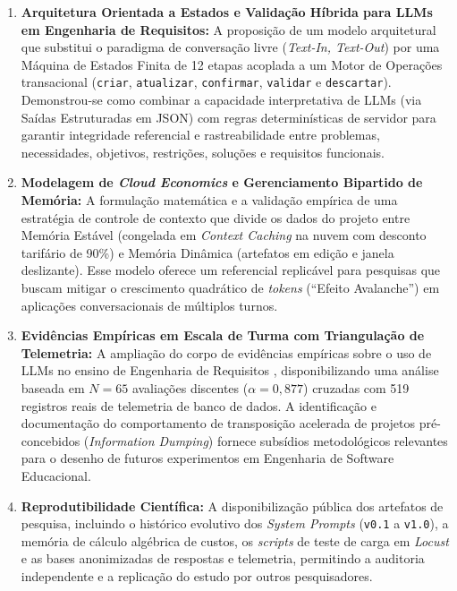 \begin{enumerate}
    \item \textbf{Arquitetura Orientada a Estados e Validação Híbrida para LLMs em Engenharia de Requisitos:} A proposição de um modelo arquitetural que substitui o paradigma de conversação livre (\textit{Text-In, Text-Out}) por uma Máquina de Estados Finita de 12 etapas acoplada a um Motor de Operações transacional (\texttt{criar}, \texttt{atualizar}, \texttt{confirmar}, \texttt{validar} e \texttt{descartar}). Demonstrou-se como combinar a capacidade interpretativa de LLMs (via Saídas Estruturadas em JSON) com regras determinísticas de servidor para garantir integridade referencial e rastreabilidade entre problemas, necessidades, objetivos, restrições, soluções e requisitos funcionais.
    \item \textbf{Modelagem de \textit{Cloud Economics} e Gerenciamento Bipartido de Memória:} A formulação matemática e a validação empírica de uma estratégia de controle de contexto que divide os dados do projeto entre Memória Estável (congelada em \textit{Context Caching} na nuvem com desconto tarifário de 90\%) e Memória Dinâmica (artefatos em edição e janela deslizante). Esse modelo oferece um referencial replicável para pesquisas que buscam mitigar o crescimento quadrático de \textit{tokens} (``Efeito Avalanche'') em aplicações conversacionais de múltiplos turnos.
    \item \textbf{Evidências Empíricas em Escala de Turma com Triangulação de Telemetria:} A ampliação do corpo de evidências empíricas sobre o uso de LLMs no ensino de Engenharia de Requisitos \cite{khan2024, urquiza2025}, disponibilizando uma análise baseada em $N = 65$ avaliações discentes ($\alpha = 0,877$) cruzadas com 519 registros reais de telemetria de banco de dados. A identificação e documentação do comportamento de transposição acelerada de projetos pré-concebidos (\textit{Information Dumping}) fornece subsídios metodológicos relevantes para o desenho de futuros experimentos em Engenharia de Software Educacional.
    \item \textbf{Reprodutibilidade Científica:} A disponibilização pública dos artefatos de pesquisa, incluindo o histórico evolutivo dos \textit{System Prompts} (\texttt{v0.1} a \texttt{v1.0}), a memória de cálculo algébrica de custos, os \textit{scripts} de teste de carga em \textit{Locust} e as bases anonimizadas de respostas e telemetria, permitindo a auditoria independente e a replicação do estudo por outros pesquisadores.
\end{enumerate}

